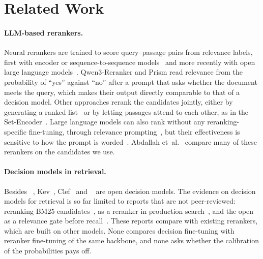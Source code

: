 \section{Related Work}
\label{sec:related-work}

\paragraph{LLM-based rerankers.}
Neural rerankers are trained to score query--passage pairs from relevance labels, first with encoder or
sequence-to-sequence models~\cite{Nogueira2019,Nogueira2020monoT5} and more recently with open large language
models~\cite{Ma2023RankLLaMA,Zhang2025Qwen3Embedding,Zhang2026Prism}. Qwen3-Reranker and Prism read relevance from the
probability of ``yes'' against ``no'' after a prompt that asks whether the document meets the query, which makes their
output directly comparable to that of a decision model. Other approaches rerank the candidates jointly, either by
generating a ranked list~\cite{Sun2023RankGPT,Pradeep2023RankZephyr} or by letting passages attend to each other, as in
the Set-Encoder~\cite{Schlatt2025SetEncoder}. Large language models can also rank without any reranking-specific
fine-tuning, through relevance prompting~\cite{Qin2024PRP,Zhuang2024BeyondYesNo}, but their effectiveness is sensitive
to how the prompt is worded~\cite{Sun2025PromptVariations}. Abdallah et~al.~\cite{Abdallah2025HowGood} compare many of
these rerankers on the candidates we use.

\paragraph{Decision models in retrieval.}
Besides \jev{}~\cite{TypeSafe2026Jev}, Kev~\cite{Kev,KevCards}, Clef~\cite{Clef} and \laya{}~\cite{Laya} are open
decision models. The evidence on decision models for retrieval is so far limited to reports that are not
peer-reviewed: \jev{} reranking BM25 candidates~\cite{S1Rank,JevRerank,LanceDB2026}, as a reranker in production
search~\cite{Elastic2026,Hindsight2026}, and the open \laya{} as a relevance gate before recall~\cite{Laya,Smriti2026}. These reports
compare \jev{} with existing rerankers, which are built on other models. None compares decision fine-tuning with
reranker fine-tuning of the same backbone, and none asks whether the calibration of the probabilities pays off.

